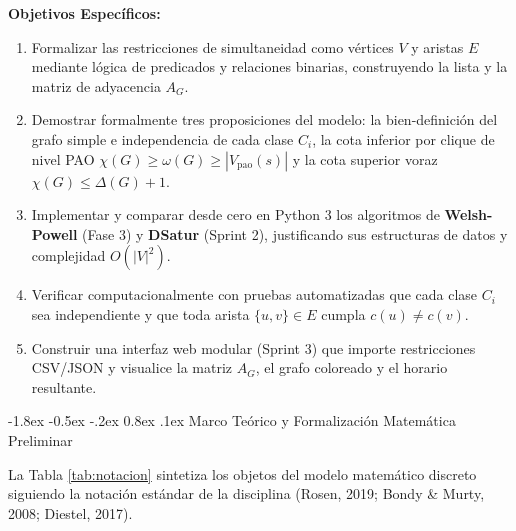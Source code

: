 \documentclass[12pt,a4paper]{article}
\makeatletter
\renewcommand\section{\@startsection {section}{1}{\z@}%
                                   {-1.8ex \@plus -0.5ex \@minus -.2ex}%
                                   {0.8ex \@plus.1ex}%
                                   {\normalfont\large\bfseries}}
\theoremstyle{definition}
\makeatother
\begin{document}
\textbf{Objetivos Específicos:}
\begin{enumerate}
    \item Formalizar las restricciones de simultaneidad como vértices $V$ y aristas $E$ mediante lógica de predicados y relaciones binarias, construyendo la lista y la matriz de adyacencia $A_G$.
    \item Demostrar formalmente tres proposiciones del modelo: la bien-definición del grafo simple e independencia de cada clase $C_i$, la cota inferior por clique de nivel PAO $\chi(G) \ge \omega(G) \ge |V_{\text{pao}}(s)|$ y la cota superior voraz $\chi(G) \le \Delta(G) + 1$.
    \item Implementar y comparar desde cero en Python 3 los algoritmos de \textbf{Welsh-Powell} (Fase 3) y \textbf{DSatur} (Sprint 2), justificando sus estructuras de datos y complejidad $O(|V|^2)$.
    \item Verificar computacionalmente con pruebas automatizadas que cada clase $C_i$ sea independiente y que toda arista $\{u, v\} \in E$ cumpla $c(u) \neq c(v)$.
    \item Construir una interfaz web modular (Sprint 3) que importe restricciones CSV/JSON y visualice la matriz $A_G$, el grafo coloreado y el horario resultante.
\end{enumerate}

\section{Marco Teórico y Formalización Matemática Preliminar}

La Tabla \ref{tab:notacion} sintetiza los objetos del modelo matemático discreto siguiendo la notación estándar de la disciplina (Rosen, 2019; Bondy \& Murty, 2008; Diestel, 2017).
\end{document}
